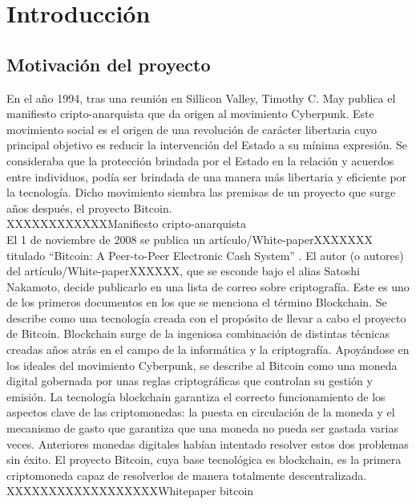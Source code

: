 \chapter{Introducción}
\section{Motivación del proyecto}

En el año 1994, tras una reunión en Sillicon Valley, Timothy C. May publica el manifiesto cripto-anarquista \cite{criptoanarquista} que da origen al movimiento Cyberpunk. Este movimiento social es el origen de una revolución de carácter libertaria cuyo principal objetivo es reducir la intervención del Estado a su mínima expresión. Se consideraba que la protección brindada por el Estado en la relación y acuerdos entre individuos, podía ser brindada de una manera más libertaria y eficiente por la tecnología. Dicho movimiento siembra las premisas de un proyecto que surge años después, el proyecto Bitcoin. \\
XXXXXXXXXXXXManifiesto cripto-anarquista \\
El 1 de noviembre de 2008 se publica un artículo/White-paperXXXXXXX titulado “Bitcoin: A Peer-to-Peer Electronic Cash System” \cite{bitcoin}. El autor (o autores) del artículo/White-paperXXXXXX, que se esconde bajo el alias Satoshi Nakamoto, decide publicarlo en una lista de correo sobre criptografía. Este es uno de los primeros documentos en los que se menciona el término Blockchain. Se describe como una tecnología creada con el propósito de llevar a cabo el proyecto de Bitcoin. Blockchain surge de la ingeniosa combinación de distintas técnicas creadas años atrás en el campo de la informática y la criptografía. Apoyándose en los ideales del movimiento Cyberpunk, se describe al Bitcoin como una moneda digital gobernada por unas reglas criptográficas que controlan su gestión y emisión. La tecnología blockchain garantiza el correcto funcionamiento de los aspectos clave de las criptomonedas: la puesta en circulación de la moneda y el mecanismo de gasto que garantiza que una moneda no pueda ser gastada varias veces. Anteriores monedas digitales habían intentado resolver estos dos problemas sin éxito. El proyecto Bitcoin, cuya base tecnológica es blockchain, es la primera criptomoneda capaz de resolverlos de manera totalmente descentralizada. \\
XXXXXXXXXXXXXXXXXXWhitepaper bitcoin \\
